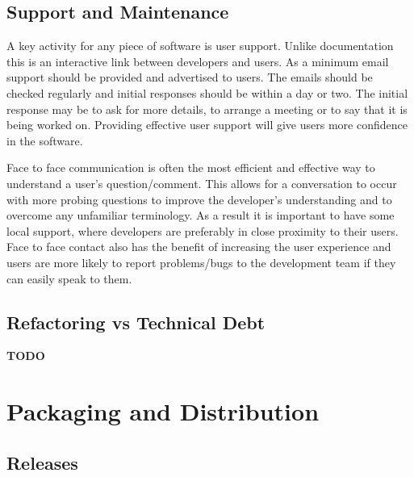\documentclass[jnr]{iosart2x}
\newcommand{\todo}[1]{\textbf{#1}}
\begin{document}
\subsection{Support and Maintenance}
\label{Support and Maintenance}

A key activity for any piece of software is user support.
Unlike documentation this is an interactive link between developers and users.
As a minimum email support should be provided and advertised to users.
The emails should be checked regularly and initial responses should be within a day or two.
The initial response may be to ask for more details, to arrange a meeting or to say that it is being worked on.
Providing effective user support will give users more confidence in the software.

Face to face communication is often the most efficient and effective way to understand a user's question/comment.
This allows for a conversation to occur with more probing questions to improve the developer's understanding and to overcome any unfamiliar terminology.
As a result it is important to have some local support, where developers are preferably in close proximity to their users.
Face to face contact also has the benefit of increasing the user experience and users are more likely to report problems/bugs to the development team if they can easily speak to them.

\subsection{Refactoring vs Technical Debt}
\label{Refactoring}

\todo{TODO}

\section{Packaging and Distribution}
\label{Packaging and Distribution}

\subsection{Releases}
\label{Releases}
\end{document}
